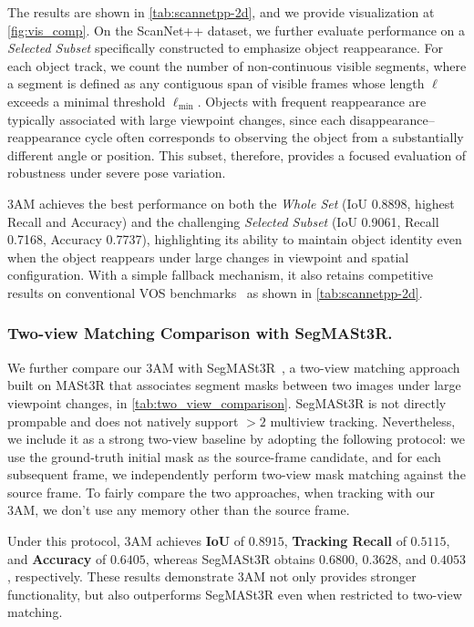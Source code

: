 The results are shown in \cref{tab:scannetpp-2d}, and we provide visualization at \cref{fig:vis_comp}.
On the ScanNet++ dataset, we further evaluate performance on a \emph{Selected Subset} specifically constructed to emphasize object reappearance.  
For each object track, we count the number of non-continuous visible segments, 
where a segment is defined as any contiguous span of visible frames whose length $\ell$ exceeds a minimal threshold $\ell_{\min}$.
Objects with frequent reappearance are typically associated with large viewpoint changes, since each disappearance–reappearance cycle often corresponds to observing the object from a substantially different angle or position.  
This subset, therefore, provides a focused evaluation of robustness under severe pose variation.

3AM achieves the best performance on both the \emph{Whole Set} (IoU 0.8898, highest Recall and Accuracy) and the challenging \emph{Selected Subset} (IoU 0.9061, Recall 0.7168, Accuracy 0.7737), highlighting its ability to maintain object identity even when the object reappears under large changes in viewpoint and spatial configuration. With a simple fallback mechanism, it also retains competitive results on conventional VOS benchmarks~\cite{perazzi2017davis, fan2019lasot, videnovic2025distractor} as shown in \cref{tab:scannetpp-2d}.

\vspace{-1em}
\subsubsection{Two-view Matching Comparison with SegMASt3R.}
We further compare our 3AM with SegMASt3R~\cite{Jayanti2025SegMASt3R}, a two-view matching approach built on MASt3R that associates segment masks between two images under large viewpoint changes, in \cref{tab:two_view_comparison}. SegMASt3R is not directly prompable and does not natively support $>2$ multiview tracking. Nevertheless, we include it as a strong two-view baseline by adopting the following protocol: we use the ground-truth initial mask as the source-frame candidate, and for each subsequent frame, we independently perform two-view mask matching against the source frame. To fairly compare the two approaches, when tracking with our 3AM, we don't use any memory other than the source frame.

Under this protocol, 3AM achieves \textbf{IoU} of $0.8915$, \textbf{Tracking Recall} of $0.5115$, and \textbf{Accuracy} of $0.6405$, whereas SegMASt3R obtains $0.6800$, $0.3628$, and $0.4053$, respectively. These results demonstrate 3AM not only provides stronger functionality, but also outperforms SegMASt3R even when restricted to two-view matching.

